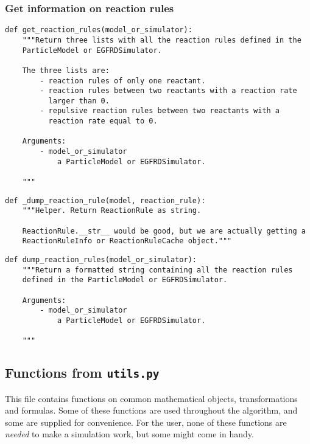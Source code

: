 \documentclass[a4paper,10pt]{article}
\begin{document}
\subsubsection{Get information on reaction rules}

\begin{verbatim}
def get_reaction_rules(model_or_simulator):
    """Return three lists with all the reaction rules defined in the 
    ParticleModel or EGFRDSimulator.

    The three lists are:
        - reaction rules of only one reactant.
        - reaction rules between two reactants with a reaction rate 
          larger than 0.
        - repulsive reaction rules between two reactants with a 
          reaction rate equal to 0.

    Arguments:
        - model_or_simulator
            a ParticleModel or EGFRDSimulator.

    """
\end{verbatim}

\begin{verbatim}
def _dump_reaction_rule(model, reaction_rule):
    """Helper. Return ReactionRule as string.

    ReactionRule.__str__ would be good, but we are actually getting a 
    ReactionRuleInfo or ReactionRuleCache object."""
\end{verbatim}

\begin{verbatim}
def dump_reaction_rules(model_or_simulator):
    """Return a formatted string containing all the reaction rules 
    defined in the ParticleModel or EGFRDSimulator.

    Arguments:
        - model_or_simulator
            a ParticleModel or EGFRDSimulator.

    """
\end{verbatim}

\subsection{Functions from \texttt{utils.py}}

This file contains functions on common mathematical objects, transformations and formulas. Some of these functions are used throughout the algorithm, and some are supplied for convenience. 
For the user, none of these functions are \textit{needed} to make a simulation work, but some might come in handy.
\end{document}
